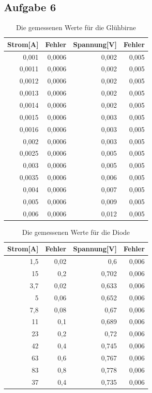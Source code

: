 \documentclass[12pt]{scrartcl}
\begin{document}
\newpage

\subsection{Aufgabe 6}
\begin{table}[htbp]
\caption{Die gemessenen Werte für die Glühbirne}
\centering
\begin{tabular}{|r|r|r|r|}
\hline
\multicolumn{1}{|l|}{Strom[A]} & \multicolumn{1}{l|}{Fehler} & \multicolumn{1}{l|}{Spannung[V]} & \multicolumn{1}{l|}{Fehler} \\ \hline
0,001 & 0,0006 & 0,002 & 0,005 \\ \hline
0,0011 & 0,0006 & 0,002 & 0,005 \\ \hline
0,0012 & 0,0006 & 0,002 & 0,005 \\ \hline
0,0013 & 0,0006 & 0,002 & 0,005 \\ \hline
0,0014 & 0,0006 & 0,002 & 0,005 \\ \hline
0,0015 & 0,0006 & 0,003 & 0,005 \\ \hline
0,0016 & 0,0006 & 0,003 & 0,005 \\ \hline
0,002 & 0,0006 & 0,003 & 0,005 \\ \hline
0,0025 & 0,0006 & 0,005 & 0,005 \\ \hline
0,003 & 0,0006 & 0,005 & 0,005 \\ \hline
0,0035 & 0,0006 & 0,006 & 0,005 \\ \hline
0,004 & 0,0006 & 0,007 & 0,005 \\ \hline
0,005 & 0,0006 & 0,009 & 0,005 \\ \hline
0,006 & 0,0006 & 0,012 & 0,005 \\ \hline
\end{tabular}
\label{aufgabe_6_gluebirne}
\end{table}

\begin{table}[htbp]
\caption{Die gemessenen Werte für die Diode}
\centering
\begin{tabular}{|r|r|r|r|}
\hline
\multicolumn{1}{|l|}{Strom[A]} & \multicolumn{1}{l|}{Fehler} & \multicolumn{1}{l|}{Spannung[V]} & \multicolumn{1}{l|}{Fehler} \\ \hline
1,5 & 0,02 & 0,6 & 0,006 \\ \hline
15 & 0,2 & 0,702 & 0,006 \\ \hline
3,7 & 0,02 & 0,633 & 0,006 \\ \hline
5 & 0,06 & 0,652 & 0,006 \\ \hline
7,8 & 0,08 & 0,67 & 0,006 \\ \hline
11 & 0,1 & 0,689 & 0,006 \\ \hline
23 & 0,2 & 0,72 & 0,006 \\ \hline
42 & 0,4 & 0,745 & 0,006 \\ \hline
63 & 0,6 & 0,767 & 0,006 \\ \hline
83 & 0,8 & 0,778 & 0,006 \\ \hline
37 & 0,4 & 0,735 & 0,006 \\ \hline
\end{tabular}
\label{aufgabe_6_diode}
\end{table}
\end{document}
